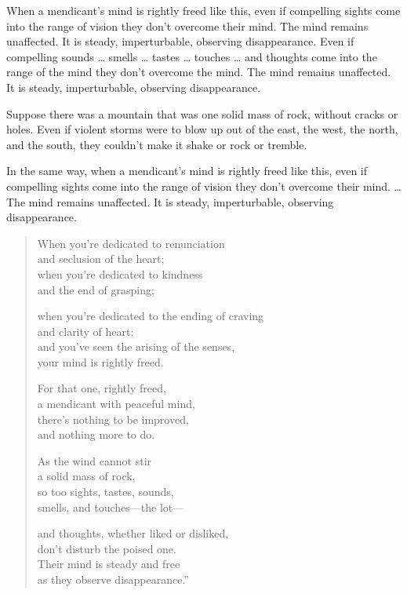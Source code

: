\documentclass[12pt,openany]{book}%
\begin{document}
When a mendicant’s mind is rightly freed like this, even if compelling sights come into the range of vision they don’t overcome their mind. The mind remains unaffected. It is steady, imperturbable, observing disappearance. Even if compelling sounds … smells … tastes … touches … and thoughts come into the range of the mind they don’t overcome the mind. The mind remains unaffected. It is steady, imperturbable, observing disappearance. 

Suppose there was a mountain that was one solid mass of rock, without cracks or holes. Even if violent storms were to blow up out of the east, the west, the north, and the south, they couldn’t make it shake or rock or tremble. 

In the same way, when a mendicant’s mind is rightly freed like this, even if compelling sights come into the range of vision they don’t overcome their mind. … The mind remains unaffected. It is steady, imperturbable, observing disappearance. 

\begin{verse}%
When you’re dedicated to renunciation \\
and seclusion of the heart; \\
when you’re dedicated to kindness \\
and the end of grasping; 

when you’re dedicated to the ending of craving \\
and clarity of heart; \\
and you’ve seen the arising of the senses, \\
your mind is rightly freed. 

For that one, rightly freed, \\
a mendicant with peaceful mind, \\
there’s nothing to be improved, \\
and nothing more to do. 

As the wind cannot stir \\
a solid mass of rock, \\
so too sights, tastes, sounds, \\
smells, and touches—the lot—

and thoughts, whether liked or disliked, \\
don’t disturb the poised one. \\
Their mind is steady and free \\
as they observe disappearance.” 

%
\end{verse}
\end{document}
